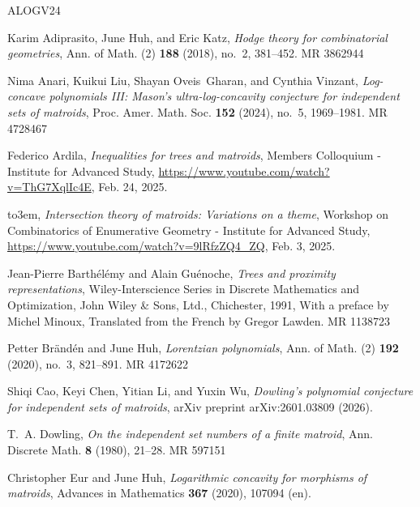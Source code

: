 \documentclass{amsart}
\theoremstyle{definition}
\theoremstyle{remark}
\newcommand{\1}{\mathbf{1}}
\numberwithin{equation}{section}
\begin{document}

\providecommand{\bysame}{\leavevmode\hbox to3em{\hrulefill}\thinspace}
\providecommand{\MR}{\relax\ifhmode\unskip\space\fi MR }
\providecommand{\MRhref}[2]{%
  \href{http://www.ams.org/mathscinet-getitem?mr=#1}{#2}
}
\providecommand{\href}[2]{#2}
\begin{thebibliography}{ALOGV24}

Karim Adiprasito, June Huh, and Eric Katz, \emph{Hodge theory for combinatorial
  geometries}, Ann. of Math. (2) \textbf{188} (2018), no.~2, 381--452.
  \MR{3862944}

Nima Anari, Kuikui Liu, Shayan Oveis~Gharan, and Cynthia Vinzant,
  \emph{Log-concave polynomials {III}: {M}ason's ultra-log-concavity conjecture
  for independent sets of matroids}, Proc. Amer. Math. Soc. \textbf{152}
  (2024), no.~5, 1969--1981. \MR{4728467}

Federico Ardila, \emph{Inequalities for trees and matroids}, Members Colloquium
  - Institute for Advanced Study,
  \url{https://www.youtube.com/watch?v=ThG7XqlIc4E}, Feb. 24, 2025.

\bysame, \emph{Intersection theory of matroids: Variations on a theme},
  Workshop on Combinatorics of Enumerative Geometry - Institute for Advanced
  Study, \url{https://www.youtube.com/watch?v=9lRfzZQ4_ZQ}, Feb. 3, 2025.

Jean-Pierre Barth\'el\'emy and Alain Gu\'enoche, \emph{Trees and proximity
  representations}, Wiley-Interscience Series in Discrete Mathematics and
  Optimization, John Wiley \& Sons, Ltd., Chichester, 1991, With a preface by
  Michel Minoux, Translated from the French by Gregor Lawden. \MR{1138723}

Petter Br\"and\'en and June Huh, \emph{Lorentzian polynomials}, Ann. of Math.
  (2) \textbf{192} (2020), no.~3, 821--891. \MR{4172622}

Shiqi Cao, Keyi Chen, Yitian Li, and Yuxin Wu, \emph{Dowling's polynomial
  conjecture for independent sets of matroids}, arXiv preprint arXiv:2601.03809
  (2026).

T.~A. Dowling, \emph{On the independent set numbers of a finite matroid}, Ann.
  Discrete Math. \textbf{8} (1980), 21--28. \MR{597151}

Christopher Eur and June Huh, \emph{Logarithmic concavity for morphisms of
  matroids}, Advances in Mathematics \textbf{367} (2020), 107094 (en).


\end{thebibliography}
\end{document}
